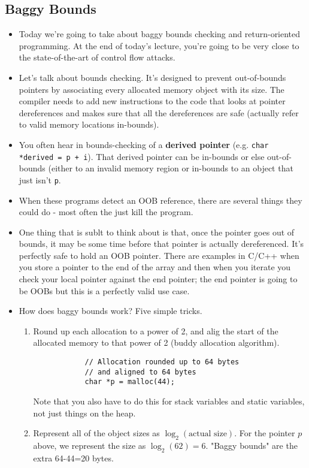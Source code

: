 \documentclass[12pt]{article}
\theoremstyle{definition}
\begin{document}
\subsection{Baggy Bounds}
\begin{itemize}
    \itemsep0em 
	\item Today we're going to take about baggy bounds checking and return-oriented programming. At the end of today's lecture, you're going to be very close to the state-of-the-art of control flow attacks.
    \item Let's talk about bounds checking. It's designed to prevent out-of-bounds pointers by associating every allocated memory object with its size. The compiler needs to add new instructions to the code that looks at pointer dereferences and makes sure that all the dereferences are safe (actually refer to valid memory locations in-bounds).
    \item You often hear in bounds-checking of a \textbf{derived pointer} (e.g. \texttt{char *derived = p + i}). That derived pointer can be in-bounds or else out-of-bounds (either to an invalid memory region or in-bounds to an object that just isn't \texttt{p}.
    \item When these programs detect an OOB reference, there are several things they could do - most often the just kill the program.
    \item One thing that is sublt to think about is that, once the pointer goes out of bounds, it may be some time before that pointer is actually dereferenced. It's perfectly safe to hold an OOB pointer. There are examples in C/C++ when you store a pointer to the end of the array and then when you iterate you check your local pointer against the end pointer; the end pointer is going to be OOBs but this is a perfectly valid use case.
    \item How does baggy bounds work? Five simple tricks.
    \begin{enumerate}
        \item Round up each allocation to a power of 2, and alig the start of the allocated memory to that power of 2 (buddy allocation algorithm). 
        \begin{lstlisting}
            // Allocation rounded up to 64 bytes
            // and aligned to 64 bytes
            char *p = malloc(44);
        \end{lstlisting}
        Note that you also have to do this for stack variables and static variables, not just things on the heap.
        \item Represent all of the object sizes as $\log_2(\text{actual size})$. For the pointer $p$ above, we represent the size as $\log_2(62) = 6$. "Baggy bounds" are the extra 64-44=20 bytes.

\end{enumerate}
\end{itemize}
\end{document}
